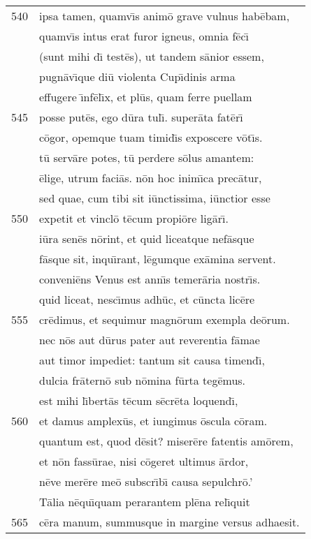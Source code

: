 \documentclass[paper=6in:9in,pagesize=pdftex,
               headinclude=on,footinclude=on,12pt]{scrbook}
\begin{document}
\begin{longtable}[p]{ r l }
540 & ipsa tamen, quamv\={\i}s anim\=o grave vulnus hab\=ebam,\\ 
 & quamv\={\i}s intus erat furor igneus, omnia f\=ec\={\i}\\ 
 & (sunt mihi d\={\i} test\=es), ut tandem s\=anior essem,\\ 
 & pugn\=av\={\i}que di\=u violenta Cup\={\i}dinis arma\\ 
 & effugere \={\i}nf\=el\={\i}x, et pl\=us, quam ferre puellam\\ 
545 & posse put\=es, ego d\=ura tul\={\i}. super\=ata fat\=er\={\i}\\ 
 & c\=ogor, opemque tuam timid\={\i}s exposcere v\=ot\={\i}s.\\ 
 & t\=u serv\=are potes, t\=u perdere s\=olus amantem:\\ 
 & \=elige, utrum faci\=as. n\=on hoc inim\={\i}ca prec\=atur,\\ 
 & sed quae, cum tibi sit i\=unctissima, i\=unctior esse\\ 
550 & expetit et vincl\=o t\=ecum propi\=ore lig\=ar\={\i}.\\ 
 & i\=ura sen\=es n\=orint, et quid liceatque nef\=asque\\ 
 & f\=asque sit, inqu\={\i}rant, l\=egumque ex\=amina servent.\\ 
 & conveni\=ens Venus est ann\={\i}s temer\=aria nostr\={\i}s.\\ 
 & quid liceat, nesc\={\i}mus adh\=uc, et c\=uncta lic\=ere\\ 
555 & cr\=edimus, et sequimur magn\=orum exempla de\=orum.\\ 
 & nec n\=os aut d\=urus pater aut reverentia f\=amae\\ 
 & aut timor impediet: tantum sit causa timend\={\i},\\ 
 & dulcia fr\=atern\=o sub n\=omina f\=urta teg\=emus.\\ 
 & est mihi l\={\i}bert\=as t\=ecum s\=ecr\=eta loquend\={\i},\\ 
560 & et damus amplex\=us, et iungimus \=oscula c\=oram.\\ 
 & quantum est, quod d\=esit? miser\=ere fatentis am\=orem,\\ 
 & et n\=on fass\=urae, nisi c\=ogeret ultimus \=ardor,\\ 
 & n\=eve mer\=ere me\=o subscr\={\i}b\={\i} causa sepulchr\=o.'\\ 
 & \indent T\=alia n\=equ\={\i}quam perarantem pl\=ena rel\={\i}quit\\ 
565 & c\=era manum, summusque in margine versus adhaesit.\\ 

\end{longtable}
\end{document}
